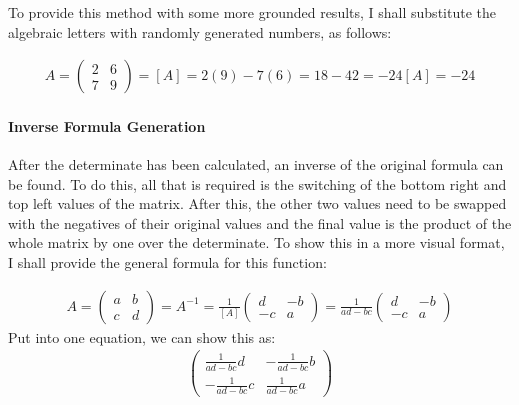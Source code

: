 \documentclass[a4paper,10pt]{article}
\begin{document}
            To provide this method with some more grounded results, I shall substitute the algebraic letters with randomly generated numbers, as follows:

            \begin{align*}
              A =
              \begin{pmatrix}
                2 & 6\\
                7 & 9
              \end{pmatrix}
              = [A] = 2(9) - 7(6) = 18 - 42 = -24
                [A] = -24
            \end{align*}

          \paragraph{Inverse Formula Generation}
            After the determinate has been calculated, an inverse of the original formula can be found. To do this, all that is required is the switching of the bottom right and top left values of the matrix. After this, the other two values need to be swapped with the negatives of their original values and the final value is the product of the whole matrix by one over the determinate. To show this in a more visual format, I shall provide the general formula for this function:

            \begin{align*}
              A =
              \begin{pmatrix}
                a & b\\
                c & d
              \end{pmatrix}
              =
              A^{-1} = \frac{1}{[A]}
              \begin{pmatrix}
                d & -b\\
                -c & a
              \end{pmatrix}
              =
              \frac{1}{ad-bc}
              \begin{pmatrix}
                d & -b\\
                -c & a
              \end{pmatrix}
            \end{align*}
            Put into one equation, we can show this as:
            \begin{align*}
              \begin{pmatrix}
                \frac{1}{ad-bc}d & -\frac{1}{ad-bc}b\\
            		-\frac{1}{ad-bc}c & \frac{1}{ad-bc}a
              \end{pmatrix}
            \end{align*}
\end{document}
